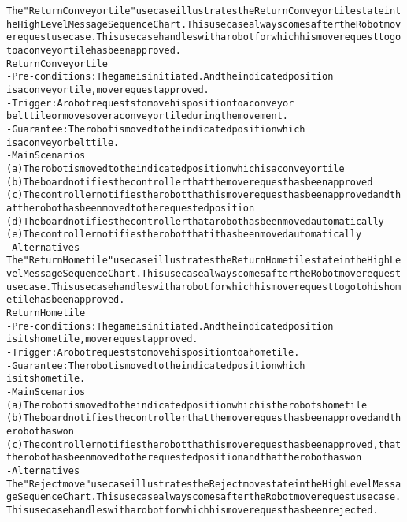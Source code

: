 \begin{alltt}
The "Return Conveyor tile" use case illustrates the Return Conveyor tile state in the High Level Message Sequence Chart. This use case always comes after the Robot move request use case. This use case handles with a robot for which his move request to go to a conveyor tile has been approved. \\

Return Conveyor tile
- Pre-conditions: The game is initiated. And the indicated position
    is a conveyor tile, move request approved.
- Trigger: A robot requests to move his position to a conveyor
    belt tile or moves over a conveyor tile during the movement.
- Guarantee: The robot is moved to the indicated position which
    is a conveyor belt tile.
- Main Scenarios
    (a) The robot is moved to the indicated position which is a conveyor tile
    (b) The board notifies the controller that the move request has been approved
    (c) The controller notifies the robot that his move request has been approved and that the robot has been moved to the requested position
    (d) The board notifies the controller that a robot has been moved automatically
    (e) The controller notifies the robot that it has been moved automatically
- Alternatives \\

The "Return Home tile" use case illustrates the Return Home tile state in the High Level Message Sequence Chart. This use case always comes after the Robot move request use case. This use case handles with a robot for which his move request to go to his home tile has been approved. \\

Return Home tile
- Pre-conditions: The game is initiated. And the indicated position
    is its home tile, move request approved.
- Trigger: A robot requests to move his position to a home tile.
- Guarantee: The robot is moved to the indicated position which
    is its home tile.
- Main Scenarios
    (a) The robot is moved to the indicated position which is the robots home tile
    (b) The board notifies the controller that the move request has been approved and the robot has won
    (c) The controller notifies the robot that his move request has been approved, that the robot has been moved to the requested position and that the robot has won
- Alternatives \\

The "Reject move" use case illustrates the Reject move state in the High Level Message Sequence Chart. This use case always comes after the Robot move request use case. This use case handles with a robot for which his move request has been rejected. \\


\end{alltt}
